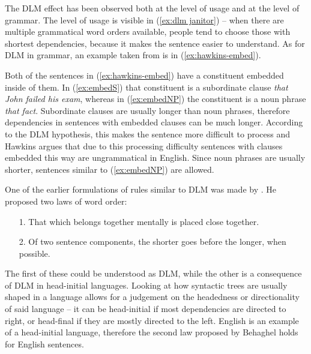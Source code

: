 The DLM effect has been observed both at the level of usage and at the level of grammar. The level of usage is visible in (\ref{ex:dlm janitor}) -- when there are multiple grammatical word orders available, people tend to choose those with shortest dependencies, because it makes the sentence easier to understand. As for DLM in grammar, an example taken from \cite[p.~20]{Hawkins-1994} is in (\ref{ex:hawkins-embed}). 
\begin{exe}
\ex\label{ex:hawkins-embed}
\begin{xlist}
	\label{ex:embedS}
	\label{ex:embedNP}
\end{xlist}
\end{exe}
Both of the sentences in (\ref{ex:hawkins-embed}) have a constituent embedded inside of them. In (\ref{ex:embedS}) that constituent is a subordinate clause \textsl{that John failed his exam}, whereas in (\ref{ex:embedNP}) the constituent is a noun phrase \textsl{that fact}. Subordinate clauses are usually longer than noun phrases, therefore dependencies in sentences with embedded clauses can be much longer. According to the DLM hypothesis, this makes the sentence more difficult to process and Hawkins argues that due to this processing difficulty sentences with clauses embedded this way are ungrammatical in English. Since noun phrases are usually shorter, sentences similar to (\ref{ex:embedNP}) are allowed. 

One of the earlier formulations of rules similar to DLM was made by \cite{behaghel}. He proposed two laws of word order:

\begin{itemize}
    \item[1.] That which belongs together mentally is placed close together.
    \item[2.] Of two sentence components, the shorter goes before the longer, when possible.
\end{itemize}

The first of these could be understood as DLM, while the other is a consequence of DLM in head-initial languages. Looking at how syntactic trees are usually shaped in a language allows for a judgement on the headedness or directionality of said language -- it can be head-initial if most dependencies are directed to right, or head-final if they are mostly directed to the left. English is an example of a head-initial language, therefore the second law proposed by Behaghel holds for English sentences. 

